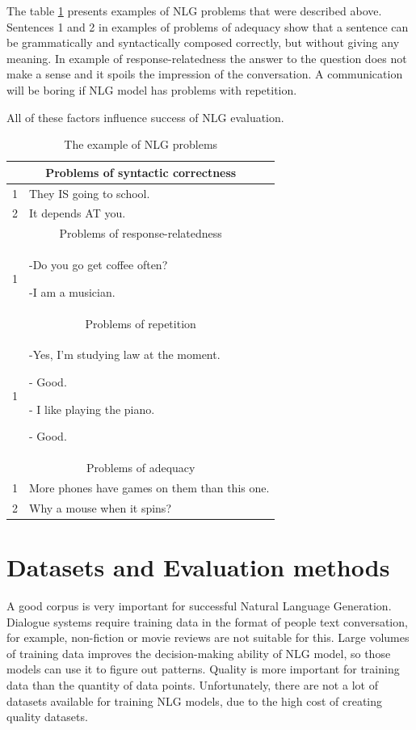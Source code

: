 The table \ref{tab:nlg_problems_example} presents examples of NLG problems that were described above. Sentences 1 and 2 in examples of problems of adequacy show that a sentence can be grammatically and syntactically composed correctly, but without giving any meaning. In example of response-relatedness the answer to the question does not make a sense and it spoils the impression of the conversation. A communication will be boring if NLG model has problems with repetition.

All of these factors influence success of NLG evaluation.  

\begin{table}[t]
\centering
 \begin{tabular}{|p{0.5cm}|p{8cm}|} 
 \hline
 \multicolumn{2}{|c|}{Problems of syntactic correctness} \\
 \hline
 1 & They IS going to school. \\ 
 \hline
 2 & It depends AT you. \\
 \hline
 \multicolumn{2}{|c|}{Problems of response-relatedness} \\
 \hline
 1 & -Do you go get coffee often? 

    -I am a musician. \\
 \hline
 \multicolumn{2}{|c|}{Problems of repetition} \\
 \hline
 1 & -Yes, I'm studying law at the moment.

     - Good.

     - I like playing the piano.

     - Good. \\
 \hline
 \multicolumn{2}{|c|}{Problems of adequacy} \\
 \hline
 1 & More phones have games on them than this one. \\
 \hline
 2 & Why a mouse when it spins? \\
 \hline
 \end{tabular}
 \caption{The example of NLG problems}
\label{tab:nlg_problems_example}
\end{table}


\chapter{Datasets and Evaluation methods}
A good corpus is very important for successful Natural Language Generation. Dialogue systems require training data in the format of people text conversation, for example, non-fiction or movie reviews are not suitable for this. Large volumes of training data improves the decision-making ability of NLG model, so those models can use it to figure out patterns. Quality is more important for training data than the quantity of data points. Unfortunately, there are not a lot of datasets available for training NLG models, due to the high cost of creating quality datasets. 

